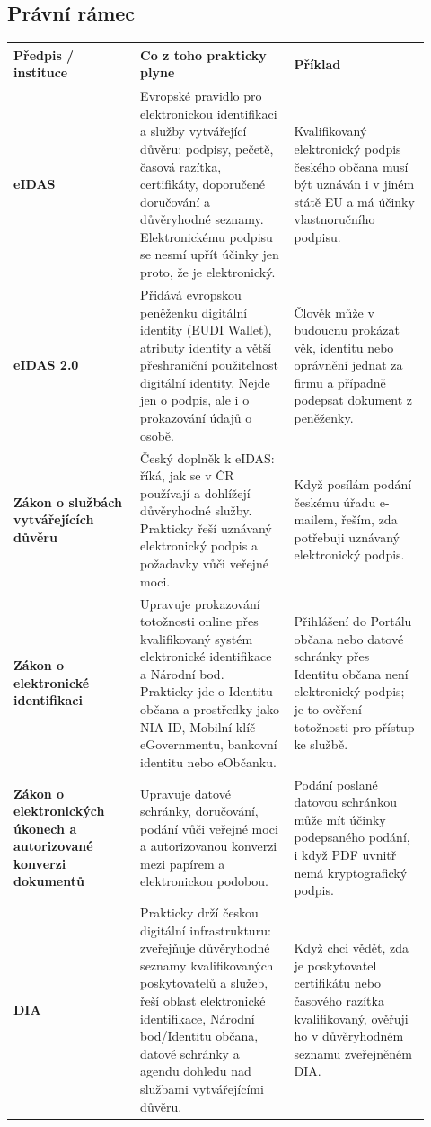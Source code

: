 \subsection*{Právní rámec}
\begin{longtable}{p{0.28\linewidth}p{0.34\linewidth}p{0.30\linewidth}}
\toprule
\textbf{Předpis / instituce} & \textbf{Co z toho prakticky plyne} & \textbf{Příklad}\\
\midrule
\textbf{eIDAS} & Evropské pravidlo pro elektronickou identifikaci a služby vytvářející důvěru: podpisy, pečetě, časová razítka, certifikáty, doporučené doručování a důvěryhodné seznamy. Elektronickému podpisu se nesmí upřít účinky jen proto, že je elektronický. & Kvalifikovaný elektronický podpis českého občana musí být uznáván i v jiném státě EU a má účinky vlastnoručního podpisu.\\
\addlinespace
\textbf{eIDAS 2.0} & Přidává evropskou peněženku digitální identity (EUDI Wallet), atributy identity a větší přeshraniční použitelnost digitální identity. Nejde jen o podpis, ale i o prokazování údajů o osobě. & Člověk může v budoucnu prokázat věk, identitu nebo oprávnění jednat za firmu a případně podepsat dokument z peněženky.\\
\addlinespace
\textbf{Zákon o službách vytvářejících důvěru} & Český doplněk k eIDAS: říká, jak se v ČR používají a dohlížejí důvěryhodné služby. Prakticky řeší uznávaný elektronický podpis a požadavky vůči veřejné moci. & Když posílám podání českému úřadu e-mailem, řeším, zda potřebuji uznávaný elektronický podpis.\\
\addlinespace
\textbf{Zákon o elektronické identifikaci} & Upravuje prokazování totožnosti online přes kvalifikovaný systém elektronické identifikace a Národní bod. Prakticky jde o Identitu občana a prostředky jako NIA ID, Mobilní klíč eGovernmentu, bankovní identitu nebo eObčanku. & Přihlášení do Portálu občana nebo datové schránky přes Identitu občana není elektronický podpis; je to ověření totožnosti pro přístup ke službě.\\
\addlinespace
\textbf{Zákon o elektronických úkonech a autorizované konverzi dokumentů} & Upravuje datové schránky, doručování, podání vůči veřejné moci a autorizovanou konverzi mezi papírem a elektronickou podobou. & Podání poslané datovou schránkou může mít účinky podepsaného podání, i když PDF uvnitř nemá kryptografický podpis.\\
\addlinespace
\textbf{DIA} & Prakticky drží českou digitální infrastrukturu: zveřejňuje důvěryhodné seznamy kvalifikovaných poskytovatelů a služeb, řeší oblast elektronické identifikace, Národní bod/Identitu občana, datové schránky a agendu dohledu nad službami vytvářejícími důvěru. & Když chci vědět, zda je poskytovatel certifikátu nebo časového razítka kvalifikovaný, ověřuji ho v důvěryhodném seznamu zveřejněném DIA.\\
\bottomrule
\end{longtable}

